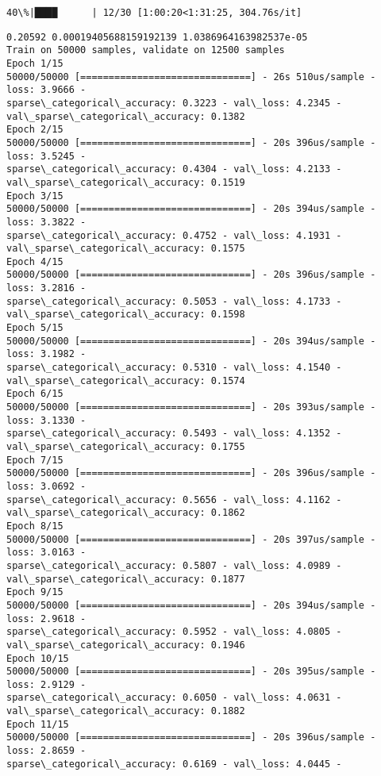\documentclass[11pt]{article}
\begin{document}
    \begin{Verbatim}[commandchars=\\\{\}]
 40\%|████      | 12/30 [1:00:20<1:31:25, 304.76s/it]
    \end{Verbatim}

    \begin{Verbatim}[commandchars=\\\{\}]
0.20592 0.00019405688159192139 1.0386964163982537e-05
Train on 50000 samples, validate on 12500 samples
Epoch 1/15
50000/50000 [==============================] - 26s 510us/sample - loss: 3.9666 -
sparse\_categorical\_accuracy: 0.3223 - val\_loss: 4.2345 -
val\_sparse\_categorical\_accuracy: 0.1382
Epoch 2/15
50000/50000 [==============================] - 20s 396us/sample - loss: 3.5245 -
sparse\_categorical\_accuracy: 0.4304 - val\_loss: 4.2133 -
val\_sparse\_categorical\_accuracy: 0.1519
Epoch 3/15
50000/50000 [==============================] - 20s 394us/sample - loss: 3.3822 -
sparse\_categorical\_accuracy: 0.4752 - val\_loss: 4.1931 -
val\_sparse\_categorical\_accuracy: 0.1575
Epoch 4/15
50000/50000 [==============================] - 20s 396us/sample - loss: 3.2816 -
sparse\_categorical\_accuracy: 0.5053 - val\_loss: 4.1733 -
val\_sparse\_categorical\_accuracy: 0.1598
Epoch 5/15
50000/50000 [==============================] - 20s 394us/sample - loss: 3.1982 -
sparse\_categorical\_accuracy: 0.5310 - val\_loss: 4.1540 -
val\_sparse\_categorical\_accuracy: 0.1574
Epoch 6/15
50000/50000 [==============================] - 20s 393us/sample - loss: 3.1330 -
sparse\_categorical\_accuracy: 0.5493 - val\_loss: 4.1352 -
val\_sparse\_categorical\_accuracy: 0.1755
Epoch 7/15
50000/50000 [==============================] - 20s 396us/sample - loss: 3.0692 -
sparse\_categorical\_accuracy: 0.5656 - val\_loss: 4.1162 -
val\_sparse\_categorical\_accuracy: 0.1862
Epoch 8/15
50000/50000 [==============================] - 20s 397us/sample - loss: 3.0163 -
sparse\_categorical\_accuracy: 0.5807 - val\_loss: 4.0989 -
val\_sparse\_categorical\_accuracy: 0.1877
Epoch 9/15
50000/50000 [==============================] - 20s 394us/sample - loss: 2.9618 -
sparse\_categorical\_accuracy: 0.5952 - val\_loss: 4.0805 -
val\_sparse\_categorical\_accuracy: 0.1946
Epoch 10/15
50000/50000 [==============================] - 20s 395us/sample - loss: 2.9129 -
sparse\_categorical\_accuracy: 0.6050 - val\_loss: 4.0631 -
val\_sparse\_categorical\_accuracy: 0.1882
Epoch 11/15
50000/50000 [==============================] - 20s 396us/sample - loss: 2.8659 -
sparse\_categorical\_accuracy: 0.6169 - val\_loss: 4.0445 -

\end{Verbatim}
\end{document}
